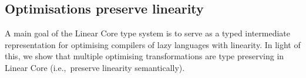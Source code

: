 \documentclass[acmsmall,review,anonymous]{acmart}
\begin{document}



%
%
%
%

\subsection{Optimisations preserve linearity\label{sec:optimisations-preserve-types-meta}}
A main goal of the Linear Core type system is 
to serve as a typed intermediate representation for optimising
compilers of lazy languages with linearity. In light of this,
we show that multiple optimising transformations are type
preserving in Linear Core (i.e.,~preserve linearity semantically).
\end{document}
